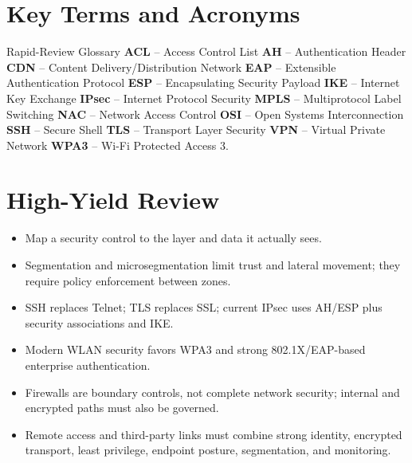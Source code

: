\documentclass[10pt,letterpaper]{article}
\begin{document}
\section{\color{navy}Key Terms and Acronyms}
\begin{summarybox}{Rapid-Review Glossary}
\textbf{ACL} -- Access Control List \quad
\textbf{AH} -- Authentication Header \quad
\textbf{CDN} -- Content Delivery/Distribution Network \quad
\textbf{EAP} -- Extensible Authentication Protocol \quad
\textbf{ESP} -- Encapsulating Security Payload \quad
\textbf{IKE} -- Internet Key Exchange \quad
\textbf{IPsec} -- Internet Protocol Security \quad
\textbf{MPLS} -- Multiprotocol Label Switching \quad
\textbf{NAC} -- Network Access Control \quad
\textbf{OSI} -- Open Systems Interconnection \quad
\textbf{SSH} -- Secure Shell \quad
\textbf{TLS} -- Transport Layer Security \quad
\textbf{VPN} -- Virtual Private Network \quad
\textbf{WPA3} -- Wi-Fi Protected Access 3.
\end{summarybox}

\section{\color{navy}High-Yield Review}
\begin{itemize}
\item Map a security control to the layer and data it actually sees.
\item Segmentation and microsegmentation limit trust and lateral movement; they require policy enforcement between zones.
\item SSH replaces Telnet; TLS replaces SSL; current IPsec uses AH/ESP plus security associations and IKE.
\item Modern WLAN security favors WPA3 and strong 802.1X/EAP-based enterprise authentication.
\item Firewalls are boundary controls, not complete network security; internal and encrypted paths must also be governed.
\item Remote access and third-party links must combine strong identity, encrypted transport, least privilege, endpoint posture, segmentation, and monitoring.
\end{itemize}
\end{document}
